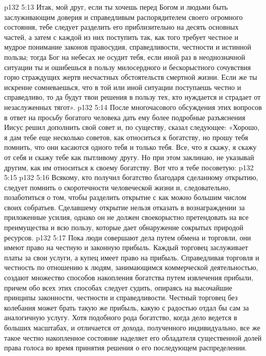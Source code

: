 \vs p132 5:13 \pc Итак, мой друг, если ты хочешь перед Богом и людьми быть заслуживающим доверия и справедливым распорядителем своего огромного состояния, тебе следует разделить его приблизительно на десять основных частей, а затем с каждой из них поступить так, как того требует честное и мудрое понимание законов правосудия, справедливости, честности и истинной пользы; тогда Бог на небесах не осудит тебя, если иной раз в неоднозначной ситуации ты и ошибешься в пользу милосердного и бескорыстного сочувствия горю страждущих жертв несчастных обстоятельств смертной жизни. Если же ты искренне сомневаешься, что в той или иной ситуации поступаешь честно и справедливо, то да будут твои решения в пользу тех, кто нуждается и страдает от незаслуженных тягот».
\vs p132 5:14 После многочасового обсуждения этих вопросов в ответ на просьбу богатого человека дать ему более подробные разъяснения Иисус решил дополнить свой совет и, по существу, сказал следующее: «Хорошо, я дам тебе еще несколько советов, как относиться к богатству, но прошу тебя помнить, что они касаются одного тебя и только тебя. Все, что я скажу, я скажу от себя и скажу тебе как пытливому другу. Но при этом заклинаю, не указывай другим, как им относиться к своему богатству. Вот что я тебе посоветую:
\vs p132 5:15 \pc 
\vs p132 5:16 \pc {}\bibnobreakspace Всякому, кто получил богатство благодаря сделанному открытию, следует помнить о скоротечности человеческой жизни и, следовательно, позаботиться о том, чтобы разделить открытие с как можно большим числом своих собратьев. Сделавшему открытие нельзя отказать в вознаграждении за приложенные усилия, однако он не должен своекорыстно претендовать на все преимущества и всю пользу, которые дает обнаружение сокрытых природой ресурсов.
\vs p132 5:17 \pc {}\bibnobreakspace Пока люди совершают дела путем обмена и торговли, они имеют право на честную и законную прибыль. Каждый торговец заслуживает платы за свои услуги, а купец имеет право на прибыль. Справедливая торговля и честность по отношению к людям, занимающимся коммерческой деятельностью, создают множество способов накопления богатства путем извлечения прибыли, причем обо всех этих способах следует судить, опираясь на высочайшие принципы законности, честности и справедливости. Честный торговец без колебания может брать такую же прибыль, какую с радостью отдал бы сам за аналогичную услугу. Хотя подобного рода богатство, когда дело ведется в больших масштабах, и отличается от дохода, полученного индивидуально, все же такое честно накопленное состояние наделяет его обладателя существенной долей права голоса во время принятия решения о его последующем распределении.
